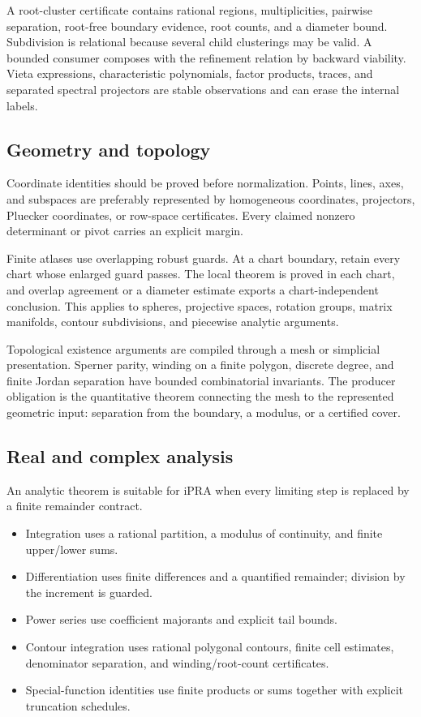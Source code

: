 A root-cluster certificate contains rational regions, multiplicities, pairwise separation, root-free boundary evidence, root counts, and a diameter bound.  Subdivision is relational because several child clusterings may be valid.  A bounded consumer composes with the refinement relation by backward viability.  Vieta expressions, characteristic polynomials, factor products, traces, and separated spectral projectors are stable observations and can erase the internal labels.

\subsection{Geometry and topology}

Coordinate identities should be proved before normalization.  Points, lines, axes, and subspaces are preferably represented by homogeneous coordinates, projectors, Pluecker coordinates, or row-space certificates.  Every claimed nonzero determinant or pivot carries an explicit margin.

Finite atlases use overlapping robust guards.  At a chart boundary, retain every chart whose enlarged guard passes.  The local theorem is proved in each chart, and overlap agreement or a diameter estimate exports a chart-independent conclusion.  This applies to spheres, projective spaces, rotation groups, matrix manifolds, contour subdivisions, and piecewise analytic arguments.

Topological existence arguments are compiled through a mesh or simplicial presentation.  Sperner parity, winding on a finite polygon, discrete degree, and finite Jordan separation have bounded combinatorial invariants.  The producer obligation is the quantitative theorem connecting the mesh to the represented geometric input: separation from the boundary, a modulus, or a certified cover.

\subsection{Real and complex analysis}

An analytic theorem is suitable for iPRA when every limiting step is replaced by a finite remainder contract.

\begin{itemize}
\item Integration uses a rational partition, a modulus of continuity, and finite upper/lower sums.
\item Differentiation uses finite differences and a quantified remainder; division by the increment is guarded.
\item Power series use coefficient majorants and explicit tail bounds.
\item Contour integration uses rational polygonal contours, finite cell estimates, denominator separation, and winding/root-count certificates.
\item Special-function identities use finite products or sums together with explicit truncation schedules.
\end{itemize}

